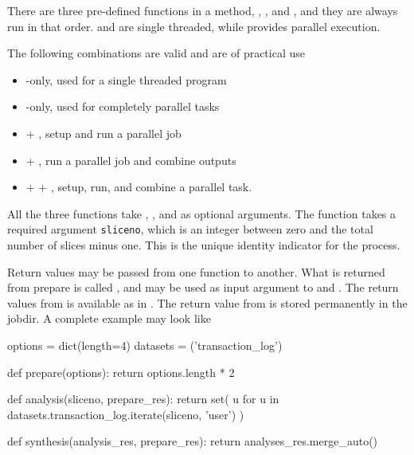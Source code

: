 There are three pre-defined functions in a method, \prepare,
\analysis, and \synthesis, and they are always run in that order.
\prepare and \synthesis are single threaded, while \analysis provides
parallel execution.

The following combinations are valid and are of practical use
\begin{itemize}
\item \synthesis-only, used for a single threaded program
\item \analysis-only, used for completely parallel tasks
\item \prepare + \analysis, setup and run a parallel job
\item \analysis + \synthesis, run a parallel job and combine outputs
\item \prepare + \analysis + \synthesis, setup, run, and combine a
  parallel task.
\end{itemize}
All the three functions take \options, \jobids, and \datasets as
optional arguments.  The \analysis function takes a required argument
\texttt{sliceno}, which is an integer between zero and the total
number of slices minus one.  This is the unique identity indicator for
the \analysis process.

Return values may be passed from one function to another.  What is
returned from prepare is called \prepareres, and may be used as input
argument to \analysis and \synthesis.  The return values from
\analysis is available as \analysisres in \synthesis.  The return
value from \synthesis is stored permanently in the jobdir.  A complete
example may look like
\begin{python}
options = dict(length=4)
datasets = ('transaction_log')

def prepare(options):
  return options.length * 2

def analysis(sliceno, prepare_res):
  return set(
    u for u in datasets.transaction_log.iterate(sliceno, 'user')
  )

def synthesis(analysis_res, prepare_res):
   return analyses_res.merge_auto()
\end{python}


